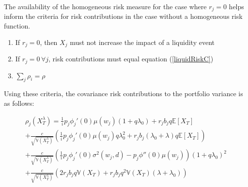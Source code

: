\documentclass[12pt]{article}
\theoremstyle{definition}
\newtheorem{riskmeasure}{Definition}
\begin{document}
 The availability of the homogeneous risk measure for the case where \(r_j=0\) helps inform the criteria for risk contributions in the case without a homogeneous risk function.  
\begin{enumerate} \label{criteria}
\item If \(r_j=0\), then \(X_j\) must not increase the impact of a liquidity event

\item  If \(r_j=0\,\forall j\), risk contributions must equal equation (\ref{liquidRiskC})
\item\( \sum_{j} \rho_i =\rho \)
\end{enumerate}

Using these criteria, the covariance risk contributions to the portfolio variance is as follows:

\begin{multline} \label{liquidityRiskContributions}
\rho_j(X_T ^ \lambda)=\frac{1}{i}p_j \phi_j '(0)\mu(w_j) \left(1+q\lambda_0  \right) +r_j b_j q \mathbb{E}[X_T] \\+\frac{c}{\sqrt{\mathbb{V}(X_T ^ {\lambda})}}\left(\frac{1}{i}p_j \phi_j '(0)\mu(w_j) q \lambda_0 ^2 +r_j b_j (\lambda_0+\lambda)q \mathbb{E}[X_T]  \right)\\+\frac{c}{\sqrt{\mathbb{V}(X_T ^ {\lambda})}}\left(\frac{1}{i}p_j \phi_j '(0) \sigma^2(w_j, d)-p_j\phi''(0)   \mu(w_j) \right)(1+q \lambda_0)^2 \\
+\frac{c}{\sqrt{\mathbb{V}(X_T ^ {\lambda})}}\left(2 r_j b_j q \mathbb{V}(X_T)+r_j b_j q^2 \mathbb{V}(X_T)(\lambda+\lambda_0)\right)
\end{multline}






\end{document}
